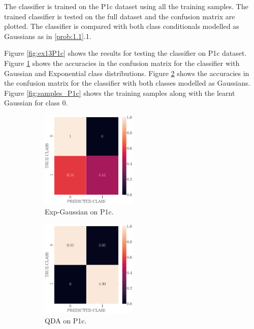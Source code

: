 \documentclass[11pt, a4 paper]{article}
\begin{document}
The classifier is trained on the P1c dataset using all the training samples. The trained classifier is tested on the full dataset and the confusion matrix are plotted. The classifier is compared with both class conditionals modelled as Gaussians as in \ref{prob:1.1}.1.

Figure \ref{fig:ex13P1c} shows the results for testing the classifier on P1c dataset. Figure \ref{fig:EXP_P1c} shows the accuracies in the confusion matrix for the classifier with Gaussian and Exponential class distributions. Figure \ref{fig:QDA_EXP_P1c} shows the accuracies in the confusion matrix for the classifier with both classes modelled as Gaussians. Figure \ref{fig:samples_P1c} shows the training samples along with the learnt Gaussian for class $0$. 

\begin{figure}[!htbp]
\centering
    \begin{subfigure}[!htbp]{0.24\textwidth}
       \centering
       \includegraphics[width=1.8in]{../results/ex1/conf_mtx_QD_EXP_ML_dataset_P1c_size_199.pdf}
       \caption{Exp-Gaussian on P1c.}
       \label{fig:EXP_P1c}
    \end{subfigure}
\quad
    \begin{subfigure}[!htbp]{0.24\textwidth}
       \centering
       \includegraphics[width=1.8in]{../results/ex1/conf_mtx_QD_ML_dataset_P1c_size_199.pdf}
       \caption{QDA on P1c.}
       \label{fig:QDA_EXP_P1c}
    \end{subfigure}
\quad    
    \begin{subfigure}[!htbp]{0.24\textwidth}
       \centering

\end{subfigure}
\end{figure}
\end{document}
